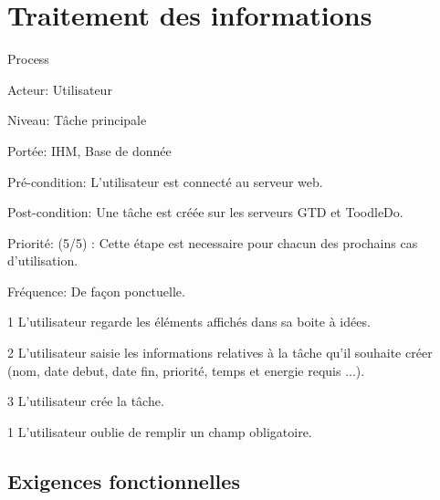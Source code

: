 \section{Traitement des informations}
\begin{usecase}{Process}

\begin{information}
\item[Acteur: ] Utilisateur
\item[Niveau:] Tâche principale
\item[Portée:] IHM, Base de donnée 
\item[Pré-condition:] L'utilisateur est connecté au serveur web. 
\item[Post-condition:] Une tâche est créée sur les serveurs GTD et ToodleDo. 
\item[Priorité:] (5/5) : Cette étape est necessaire pour chacun des prochains cas d'utilisation.
\item[Fréquence:] De façon ponctuelle.	
\end{information}	

\begin{scenario}
\item[1] L'utilisateur regarde les éléments affichés dans sa boite à idées.
\item[2] L'utilisateur saisie les informations relatives à la tâche qu'il souhaite créer (nom, date debut, date fin, priorité, temps et energie requis ...).
\item[3] L'utilisateur crée la tâche.
\end{scenario}	

\begin{extension}
	\item[1]L'utilisateur oublie de remplir un champ obligatoire.
\end{extension}
\end{usecase}

\subsection{Exigences fonctionnelles}

